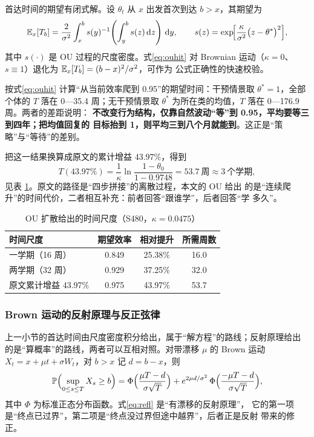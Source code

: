首达时间的期望有闭式解。设 $\theta_t$ 从 $x$ 出发首次到达 $b>x$，其期望为
\begin{equation}
\mathbb{E}_x[T_b]=\frac{2}{\sigma^2}\int_{x}^{b}s(y)^{-1}\!\left(\int_{y}^{b}s(z)\,\mathrm{d} z\right)\,\mathrm{d} y,
\qquad
s(z)=\exp\!\Bigl[\frac{\kappa}{\sigma^2}\bigl(z-\theta^{*}\bigr)^2\Bigr],
\label{eq:ouhit}
\end{equation}
其中 $s(\cdot)$ 是 OU 过程的尺度密度。式\eqref{eq:ouhit} 对 Brownian
运动（$\kappa=0$、$s\equiv1$）退化为 $\mathbb{E}_x[T_b]=(b-x)^2/\sigma^2$，可作为
公式正确性的快速校验。

按式\eqref{eq:ouhit} 计算“从当前效率爬到 0.95”的期望时间：干预情景取
$\theta^{*}=1$，全部个体的 $T$ 落在 0—35.4 周；无干预情景取
$\theta^{*}$ 为所在类的均值，$T$ 落在 0—176.9 周。两者的差距说明：\textbf{
不改变行为结构，仅靠自然波动“等”到 0.95，平均要等三到四年；把均值回复的
目标抬到 1，则平均三到八个月就能到}。这正是“策略”与“等待”的差别。

把这一结果换算成原文的累计增益 43.97\%，得到
\begin{equation}
T(43.97\%)=\frac{1}{\kappa}\ln\frac{1-\theta_0}{1-0.9748}=53.7\ \text{周}
\approx 3\ \text{个学期},
\label{eq:t43}
\end{equation}
见表 \ref{tab:gain}。原文的路径是“四步拼接”的离散过程，本文的 OU 给出
的是“连续爬升”的时间代价，二者相互补充：前者回答“跟谁学”，后者回答“学
多久”。

\begin{table}[htbp]
\centering
\tabfont
\caption{OU 扩散给出的时间尺度（S480，$\kappa=0.0475$）}
\label{tab:gain}
\begin{tabular}{@{}lccc@{}}
\toprule
时间尺度 & 期望效率 & 相对提升 & 所需周数 \\
\midrule
一学期（16 周） & 0.849 & 25.38\% & 16.0 \\
两学期（32 周） & 0.929 & 37.25\% & 32.0 \\
原文累计增益 43.97\% & 0.975 & 43.97\% & 53.7 \\
\bottomrule
\end{tabular}
\end{table}

\subsubsection{Brown 运动的反射原理与反正弦律}

上一小节的首达时间由尺度密度积分给出，属于“解方程”的路线；反射原理给出
的是“算概率”的路线，两者可以互相对照。对带漂移 $\mu$ 的
Brown 运动 $X_t=x+\mu t+\sigma W_t$，对 $b>x$ 记 $d=b-x$，则
\begin{equation}
\mathbb{P}\Bigl(\sup_{0\le s\le T}X_s\ge b\Bigr)
=\Phi\Bigl(\frac{\mu T-d}{\sigma\sqrt{T}}\Bigr)
+e^{2\mu d/\sigma^{2}}\,
\Phi\Bigl(\frac{-\mu T-d}{\sigma\sqrt{T}}\Bigr),
\label{eq:refl}
\end{equation}
其中 $\Phi$ 为标准正态分布函数。式\eqref{eq:refl} 是“有漂移的反射原理”，
它的第一项是“终点已过界”，第二项是“终点没过界但途中越界”，后者正是反射
带来的修正。

